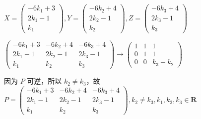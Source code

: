 \begin{enumerate}
\begin{enumerate}
        $X = \begin{pmatrix}-6k_1+3 \\ 2k_1-1 \\ k_1\end{pmatrix},Y = \begin{pmatrix}-6k_2+4 \\ 2k_2-1 \\ k_2\end{pmatrix},Z = \begin{pmatrix}-6k_3+4 \\ 2k_3-1 \\ k_3\end{pmatrix}$
        
        $\begin{pmatrix}-6k_1+3 & -6k_2+4 & -6k_3+4 \\ 2k_1-1 & 2k_2-1 & 2k_3-1 \\ k_1 & k_2 & k_3\end{pmatrix}\rightarrow \begin{pmatrix}1 & 1 & 1 \\ 0 & 1 & 1 \\ 0 & 0 & k_3-k_2\end{pmatrix}$

        因为 $P$ 可逆，所以 $k_2\neq k_3$，故 $P=\begin{pmatrix}-6k_1+3 & -6k_2+4 & -6k_3+4 \\ 2k_1-1 & 2k_2-1 & 2k_3-1 \\ k_1 & k_2 & k_3\end{pmatrix},k_2\neq k_3, k_1,k_2,k_3 \in \mathbf{R}$
    \end{enumerate}
\end{enumerate}

